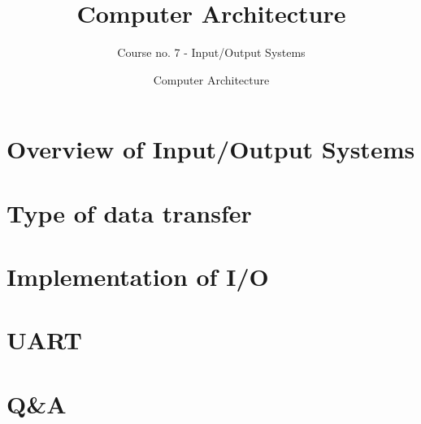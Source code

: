 \documentclass[usenames,dvipsnames]{beamer}             %
\title[Computer Architecture] %
{Computer Architecture}
\subtitle{Course no. 7 - Input/Output Systems}
\author[Ștefan-Dan Ciocîrlan] %
{}
\institute[NUSTPB] %
{
  \inst{}%
  National University of Science and Technology\\
  POLITEHNICA Bucharest
}
\date[NUSTPB 2024] %
{Computer Architecture}
\begin{document}
\frame{\titlepage}

\section{Overview of Input/Output Systems}


\section{Type of data transfer}


\section{Implementation of I/O}


\section{UART}



\section{Q\&A}
\begin{frame}
\end{frame}

\end{document}
